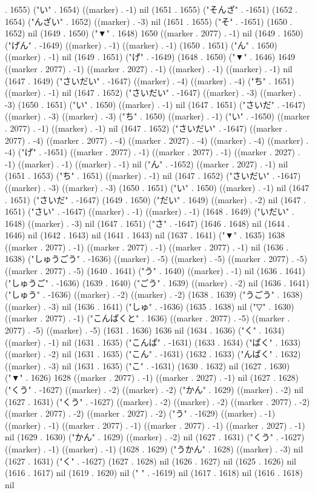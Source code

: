 . 1655) ("い" . 1654) ((marker) . -1) nil (1651 . 1655) ("そんざ" . -1651) (1652 . 1654) ("んざい" . 1652) ((marker) . -3) nil (1651 . 1655) ("そ" . -1651) (1650 . 1652) nil (1649 . 1650) ("▼" . 1648) 1650 ((marker . 2077) . -1) nil (1649 . 1650) ("げん" . -1649) ((marker) . -1) ((marker) . -1) (1650 . 1651) ("ん" . 1650) ((marker) . -1) nil (1649 . 1651) ("げ" . -1649) (1648 . 1650) ("▼" . 1646) 1649 ((marker . 2077) . -1) ((marker . 2027) . -1) ((marker) . -1) ((marker) . -1) nil (1647 . 1649) ("さいだい" . -1647) ((marker) . -4) ((marker) . -4) ("ち" . 1651) ((marker) . -1) nil (1647 . 1652) ("さいだい" . -1647) ((marker) . -3) ((marker) . -3) (1650 . 1651) ("い" . 1650) ((marker) . -1) nil (1647 . 1651) ("さいだ" . -1647) ((marker) . -3) ((marker) . -3) ("ち" . 1650) ((marker) . -1) ("い" . -1650) ((marker . 2077) . -1) ((marker) . -1) nil (1647 . 1652) ("さいだい" . -1647) ((marker . 2077) . -4) ((marker . 2077) . -4) ((marker . 2027) . -4) ((marker) . -4) ((marker) . -4) ("げ" . -1651) ((marker . 2077) . -1) ((marker . 2077) . -1) ((marker . 2027) . -1) ((marker) . -1) ((marker) . -1) nil ("ん" . -1652) ((marker . 2027) . -1) nil (1651 . 1653) ("ち" . 1651) ((marker) . -1) nil (1647 . 1652) ("さいだい" . -1647) ((marker) . -3) ((marker) . -3) (1650 . 1651) ("い" . 1650) ((marker) . -1) nil (1647 . 1651) ("さいだ" . -1647) (1649 . 1650) ("だい" . 1649) ((marker) . -2) nil (1647 . 1651) ("さい" . -1647) ((marker) . -1) ((marker) . -1) (1648 . 1649) ("いだい" . 1648) ((marker) . -3) nil (1647 . 1651) ("さ" . -1647) (1646 . 1648) nil (1644 . 1646) nil (1642 . 1643) nil (1641 . 1643) nil (1637 . 1641) ("▼" . 1635) 1638 ((marker . 2077) . -1) ((marker . 2077) . -1) ((marker . 2077) . -1) nil (1636 . 1638) ("しゅうごう" . -1636) ((marker) . -5) ((marker) . -5) ((marker . 2077) . -5) ((marker . 2077) . -5) (1640 . 1641) ("う" . 1640) ((marker) . -1) nil (1636 . 1641) ("しゅうご" . -1636) (1639 . 1640) ("ごう" . 1639) ((marker) . -2) nil (1636 . 1641) ("しゅう" . -1636) ((marker) . -2) ((marker) . -2) (1638 . 1639) ("うごう" . 1638) ((marker) . -3) nil (1636 . 1641) ("しゅ" . -1636) (1635 . 1638) nil ("▽" . 1630) ((marker . 2077) . -1) ("こんぱくと" . 1636) ((marker . 2077) . -5) ((marker . 2077) . -5) ((marker) . -5) (1631 . 1636) 1636 nil (1634 . 1636) ("く" . 1634) ((marker) . -1) nil (1631 . 1635) ("こんぱ" . -1631) (1633 . 1634) ("ぱく" . 1633) ((marker) . -2) nil (1631 . 1635) ("こん" . -1631) (1632 . 1633) ("んぱく" . 1632) ((marker) . -3) nil (1631 . 1635) ("こ" . -1631) (1630 . 1632) nil (1627 . 1630) ("▼" . 1626) 1628 ((marker . 2077) . -1) ((marker . 2027) . -1) nil (1627 . 1628) ("くう" . -1627) ((marker) . -2) ((marker) . -2) ("かん" . 1629) ((marker) . -2) nil (1627 . 1631) ("くう" . -1627) ((marker) . -2) ((marker) . -2) ((marker . 2077) . -2) ((marker . 2077) . -2) ((marker . 2027) . -2) ("う" . -1629) ((marker) . -1) ((marker) . -1) ((marker . 2077) . -1) ((marker . 2077) . -1) ((marker . 2027) . -1) nil (1629 . 1630) ("かん" . 1629) ((marker) . -2) nil (1627 . 1631) ("くう" . -1627) ((marker) . -1) ((marker) . -1) (1628 . 1629) ("うかん" . 1628) ((marker) . -3) nil (1627 . 1631) ("く" . -1627) (1627 . 1628) nil (1626 . 1627) nil (1625 . 1626) nil (1616 . 1617) nil (1619 . 1620) nil (" " . -1619) nil (1617 . 1618) nil (1616 . 1618) nil 